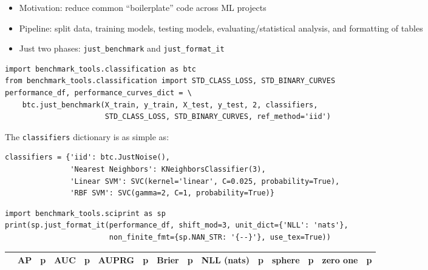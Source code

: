 \documentclass[a0,landscape]{a0poster}
\newcommand{\code}{\texttt}
\begin{document}
\begin{multicols}{2}
\begin{itemize}
  \item Motivation: reduce common ``boilerplate'' code across ML projects
  \item Pipeline: split data, training models, testing models, evaluating/statistical analysis, and formatting of tables
  \item Just two phases: \code{just\_benchmark} and \code{just\_format\_it}
\end{itemize}
%
\begin{verbatim}
import benchmark_tools.classification as btc
from benchmark_tools.classification import STD_CLASS_LOSS, STD_BINARY_CURVES
performance_df, performance_curves_dict = \
    btc.just_benchmark(X_train, y_train, X_test, y_test, 2, classifiers,
                       STD_CLASS_LOSS, STD_BINARY_CURVES, ref_method='iid')
\end{verbatim}
The \code{classifiers} dictionary is as simple as:
\vspace{-2mm}
\begin{verbatim}
classifiers = {'iid': btc.JustNoise(),
               'Nearest Neighbors': KNeighborsClassifier(3),
               'Linear SVM': SVC(kernel='linear', C=0.025, probability=True),
               'RBF SVM': SVC(gamma=2, C=1, probability=True)}
\end{verbatim}
\begin{verbatim}
import benchmark_tools.sciprint as sp
print(sp.just_format_it(performance_df, shift_mod=3, unit_dict={'NLL': 'nats'},
                        non_finite_fmt={sp.NAN_STR: '{--}'}, use_tex=True))
\end{verbatim}
%
\begin{center}
{\tiny
\setlength{\tabcolsep}{0.75em} %
\begin{tabular}{|l|l|r|l|r|l|r|l|r|l|r|l|r|l|r|}
\toprule
{}                &       {AP} &      {p} &      {AUC} &      {p} &  {AUPRG} &      {p} &    {Brier} &      {p} & {NLL (nats)} &      {p} &   {sphere} &      {p} & {zero one} &      {p} \\
\midrule

\end{tabular}}
\end{center}
\end{multicols}
\end{document}
